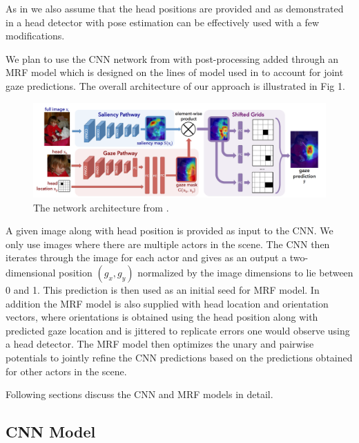 \documentclass[10pt,twocolumn,letterpaper]{article}
\begin{document}
As in \cite{nips15_recasens} we also assume that the head positions are provided and as demonstrated in \cite{parks2015augmented} a head detector with pose estimation can be effectively used with a few modifications.

We plan to use the CNN network from \cite{nips15_recasens} with post-processing added through an MRF model which is designed on the lines of model used in \cite{fathi2012social} to account for joint gaze predictions. The overall architecture of our approach is illustrated in Fig 1.

\begin{figure}[t]
  \begin{center}
    \includegraphics[width=0.95\linewidth]{images/cnn.png}
  \end{center}
  \vspace{-0.3cm}
   \caption{The network architecture from \cite{nips15_recasens}.}
  \vspace{-0.5cm}
\end{figure}

A given image along with head position is provided as input to the CNN. We only use images where there are multiple actors in the scene. The CNN then iterates through the image for each actor and gives as an output a two-dimensional position $(g_x, g_y)$ normalized by the image dimensions to lie between 0 and 1. This prediction is then used as an initial seed for MRF model. In addition the MRF model is also supplied with head location and orientation vectors, where orientations is obtained using the head position along with predicted gaze location and is jittered to replicate errors one would observe using a head detector. The MRF model then optimizes the unary and pairwise potentials to jointly refine the CNN predictions based on the predictions obtained for other actors in the scene.

Following sections discuss the CNN and MRF models in detail.

\subsection{CNN Model}
\end{document}
